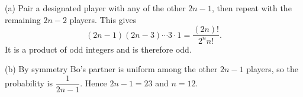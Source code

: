(a) Pair a designated player with any of the other $2n-1$, then repeat with the remaining $2n-2$ players. This gives
\[
\boxed{(2n-1)(2n-3)\cdots3\cdot1=\dfrac{(2n)!}{2^n n!}}.
\]
It is a product of odd integers and is therefore odd.

(b) By symmetry Bo's partner is uniform among the other $2n-1$ players, so the probability is $\dfrac{1}{2n-1}$. Hence $2n-1=23$ and $\boxed{n=12}$.
